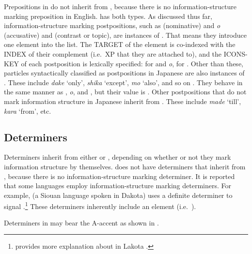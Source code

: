 Prepositions in  do not inherit from ,
because there is no information-structure marking preposition in
English.   has both types. As discussed thus far,
information-structure marking postpositions, such as {\ga}
(nominative) and \textit{o} (accusative) and {\wa} (contrast or
topic), are instances of 
. That means they
introduce one element into the  list. The TARGET of the
 element is co-indexed with the INDEX of their complement
(i.e.\ XP that they are attached to), and the ICONS-KEY of each
postposition is lexically specified:  for
{\ga} and \textit{o},  for \wa.  Other than
these,  particles syntactically classified as postpositions in
Japanese are also instances of .  These
include \textit{dake} `only', \textit{shika} `except', \textit{mo}
`also', and so on \citep{hasegawa:11,hasegawa:koenig:11}. They behave
in the same manner as {\ga}, \textit{o}, and {\wa}, but their
 value is . Other
postpositions that do not mark information structure in Japanese
inherit from . These include \textit{made}
`till', \textit{kara} `from', etc.





\subsection{Determiners}
\label{10:sssec:determiners}


Determiners inherit from either  or
, depending on whether or not they mark
information structure by themselves.   does not have
determiners that inherit from , because there
is no information-structure marking determiner.  It is reported that
some languages employ information-structure marking determiners. For
example,  (a Siouan language spoken in Dakota) uses a
definite determiner \textit{}
to signal .\footnote{
provides more explanation about
  \textit{} in Lakota .}
These determiners inherently include an  element
(i.e.\ ).


Determiners in  may bear the A-accent as shown in
.

